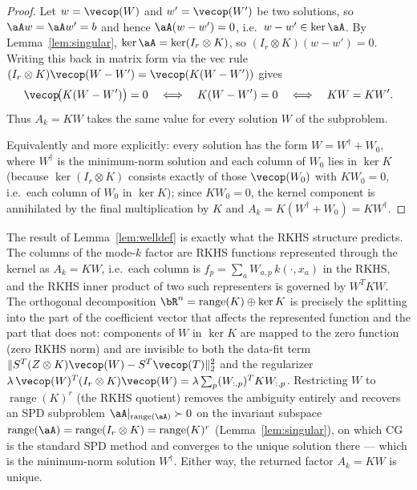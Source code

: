 \begin{proof}
Let $w=\vecop(W)$ and $w'=\vecop(W')$ be two solutions, so
$\aA w=\aA w'=b$ and hence $\aA(w-w')=0$, i.e.\ $w-w'\in\ker\aA$. By
Lemma~\ref{lem:singular}, $\ker\aA=\ker(I_r\otimes K)$, so
$(I_r\otimes K)(w-w')=0$. Writing this back in matrix form via the vec rule
$(I_r\otimes K)\vecop(W-W')=\vecop(K(W-W'))$ gives
\[
  \vecop\!\bigl(K(W-W')\bigr)=0
  \quad\Longleftrightarrow\quad
  K(W-W')=0
  \quad\Longleftrightarrow\quad
  KW=KW' .
\]
Thus $A_k=KW$ takes the same value for every solution $W$ of the subproblem.

Equivalently and more explicitly: every solution has the form
$W=W^{\dagger}+W_0$, where $W^{\dagger}$ is the minimum-norm solution and each
column of $W_0$ lies in $\ker K$ (because $\ker(I_r\otimes K)$ consists exactly
of those $\vecop(W_0)$ with $KW_0=0$, i.e.\ each column of $W_0$ in $\ker K$);
since $KW_0=0$, the kernel component is annihilated by the final multiplication
by $K$ and $A_k=K(W^{\dagger}+W_0)=KW^{\dagger}$.
\end{proof}

\begin{remark}
\label{rem:rkhs}
The result of Lemma~\ref{lem:welldef} is exactly what the RKHS structure
predicts. The columns of the mode-$k$ factor are RKHS functions represented
through the kernel as $A_k=KW$, i.e.\ each column is
$f_p=\sum_{a} W_{a,p}\,k(\cdot,x_a)$ in the RKHS, and the RKHS inner product of
two such representers is governed by $W^{T}KW$. The orthogonal decomposition
$\bR^{n}=\operatorname{range}(K)\oplus\ker K$ is precisely the splitting into
the part of the coefficient vector that affects the represented function and
the part that does not: components of $W$ in $\ker K$ are mapped to the zero
function (zero RKHS norm) and are invisible to both the data-fit term
$\|S^{T}(Z\otimes K)\vecop(W)-S^{T}\vecop(T)\|_2^2$ and the regularizer
$\lambda\,\vecop(W)^{T}(I_r\otimes K)\vecop(W)=\lambda\sum_p (W_{:,p})^{T}KW_{:,p}$.
Restricting $W$ to $\operatorname{range}(K)^{r}$ (the RKHS quotient) removes the
ambiguity entirely and recovers an SPD subproblem
$\aA|_{\operatorname{range}(\aA)}\succ0$ on the invariant subspace
$\operatorname{range}(\aA)=\operatorname{range}(I_r\otimes K)
=\operatorname{range}(K)^{r}$ (Lemma~\ref{lem:singular}), on which CG is the
standard SPD method and converges to the unique solution there --- which is the
minimum-norm solution $W^{\dagger}$. Either way, the returned factor $A_k=KW$ is
unique.
\end{remark}


